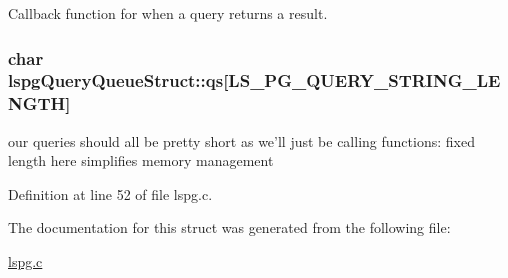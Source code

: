 Callback function for when a query returns a result. \hypertarget{structlspgQueryQueueStruct_abf8c9c581b38a5e3e269eda69e47de15}{
\subsubsection[{qs}]{\setlength{\rightskip}{0pt plus 5cm}char {\bf lspgQueryQueueStruct::qs}\mbox{[}LS\_\-PG\_\-QUERY\_\-STRING\_\-LENGTH\mbox{]}}}
\label{structlspgQueryQueueStruct_abf8c9c581b38a5e3e269eda69e47de15}


our queries should all be pretty short as we'll just be calling functions: fixed length here simplifies memory management 

Definition at line 52 of file lspg.c.

The documentation for this struct was generated from the following file:\begin{DoxyCompactItemize}
\item 
\hyperlink{lspg_8c}{lspg.c}\end{DoxyCompactItemize}
